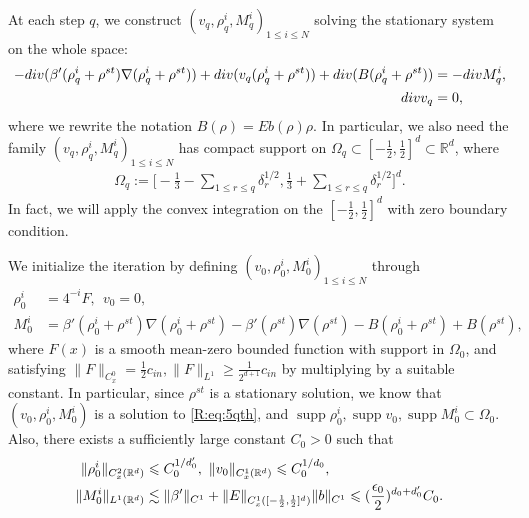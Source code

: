 \documentclass[10pt,a4paper]{amsart}
\numberwithin{equation}{section}
\DeclareMathOperator{\supp}{supp}
\def\[{{\Big[}}
\def\]{{\Big]}}
\def\geq{\geqslant}
\def\leq{\leqslant}
\def\div{\mathord{{\rm div}}}
\def\[{{\Big[}}
\def\]{{\Big]}}
\def\geq{\geqslant}
\def\leq{\leqslant}
\def\div{\mathord{{\rm div}}}
\begin{document}
At each step $q$, we construct  
$
(v_q,\rho^i_q,M^i_q)_{1\leq i\leq N}
$
solving the stationary system on the whole space:
\begin{align}
-\div(\beta'(\rho_q^i+\rho^{st})\nabla(\rho_q^i+\rho^{st}))
+
\div(v_q(\rho_q^i+\rho^{st}))+\div(B(\rho_q^i+\rho^{st}))
&=
-\div M^i_q,
\notag\\
\div v_q&=0,
\label{R:eq:5qth}
\end{align}
where we rewrite the notation
$
B(\rho)=Eb(\rho)\rho.
$
In particular, we also need the family $
(v_q,\rho^i_q,M^i_q)_{1\leq i\leq N}
$ has compact support on $\Omega_q \subset [-\frac12,\frac12]^d\subset \mathbb{R}^d$, where 
\begin{align*}
     \Omega_q := \[-\frac13-\sum_{ 1\leq r\leq q} {\delta}_r^{1/2},\frac13+\sum_{ 1\leq r\leq q} {\delta}_r^{1/2}\]^d.
\end{align*}
In fact, we will apply the convex integration on the $[-\frac12,\frac12]^d$ with zero boundary condition.

We initialize the iteration by defining
$
(v_0,\rho^i_0,M^i_0)_{1\leq i\leq N}
$
through
\begin{align*}
\rho^i_0 
&=
 4^{-i}F,
\ \
v_0 =0,
\\ 
M^i_0 
&=\beta'(\rho_0^i+\rho^{st})\nabla(\rho_0^i+\rho^{st})-\beta'(\rho^{st})\nabla(\rho^{st})
-B(\rho_0^i+\rho^{st})+B( \rho^{st}),
\end{align*}
where
$F(x)$ is a smooth mean-zero bounded   function with support in $\Omega_0$, and satisfying $\|F\|_{C_x^0}=\frac1 2 c_{in}, \|F\|_{L^1}\geq \frac1 {2^{d+1}} c_{in}$ by multiplying by a suitable constant. In particular, since $\rho^{st}$ is a stationary solution, we know that $(v_0,\rho^i_0,M^i_0)$ is a solution to \eqref{R:eq:5qth}, and $\supp\rho_0^i,\supp v_0,\supp M_0^i\subset\Omega_0$. 
Also, there exists a sufficiently large constant $C_0>0$ such that
\begin{align}
\|\rho^i_0\|_{C_x^2(\mathbb{R}^d)}
&\leq
C_0^{1/d_0'},\ \|v_0\|_{C_{x}^1(\mathbb{R}^d)}\leq C_0^{1/d_0},\notag\\ 
\|M^i_0\|_{L^1(\mathbb{R}^d)}
&\lesssim\|\beta' \|_{C^1 }+\|E \|_{C_{x}^1([-\frac12,\frac12]^d)}\|b\|_{C^1}\leq 
(\frac{\epsilon_0}{2})^{d_0+d_0'}C_0.
\label{R:bd:5rho_0,M_0}
\end{align}
 
\end{document}
